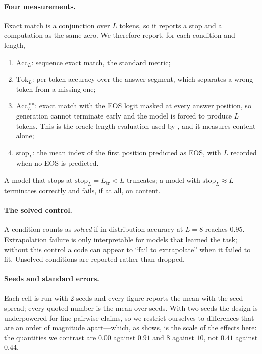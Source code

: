 \paragraph{Four measurements.} Exact match is a conjunction over $L$ tokens, so it
reports a stop and a computation as the same zero. We therefore report, for each
condition and length,
\begin{enumerate}[leftmargin=1.4em,itemsep=0pt,topsep=1pt]
\item $\mathrm{Acc}_L$: sequence exact match, the standard metric;
\item $\mathrm{Tok}_L$: per-token accuracy over the answer segment, which separates
  a wrong token from a missing one;
\item $\mathrm{Acc}^{\mathrm{ora}}_L$: exact match with the EOS logit masked at
  every answer position, so generation cannot terminate early and the model is
  forced to produce $L$ tokens. This is the oracle-length evaluation used by
  \citet{newman2020eos}, and it measures content alone;
\item $\mathrm{stop}_L$: the mean index of the first position predicted as EOS,
  with $L$ recorded when no EOS is predicted.
\end{enumerate}
A model that stops at $\mathrm{stop}_L = L_{\mathrm{tr}} < L$ truncates; a model
with $\mathrm{stop}_L \approx L$ terminates correctly and fails, if at all, on
content.

\paragraph{The solved control.} A condition counts as \emph{solved} if
in-distribution accuracy at $L{=}8$ reaches $0.95$. Extrapolation failure is only
interpretable for models that learned the task; without this control a code can
appear to ``fail to extrapolate'' when it failed to fit. Unsolved conditions are
reported rather than dropped.

\paragraph{Seeds and standard errors.} Each cell is run with 2 seeds and every
figure reports the mean with the seed spread; every quoted number is the mean over
seeds. With two seeds the design is underpowered for fine pairwise claims, so we
restrict ourselves to differences that are an order of magnitude apart---which,
as  shows, is the scale of the effects here: the quantities we
contrast are $0.00$ against $0.91$ and $8$ against $10$, not $0.41$ against
$0.44$.
